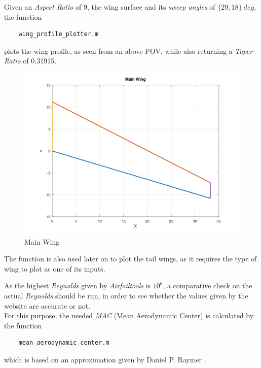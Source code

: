 \documentclass{article}
\begin{document}
Given an \textit{Aspect Ratio} of 9, the wing surface and its \textit{sweep angles} of $ \{29, 18 \} \ deg$,
the function 
\begin{verbatim}
    wing_profile_plotter.m
\end{verbatim}
plots the wing profile, as seen from an above POV, while also returning a \textit{Taper Ratio} of 0.31915.\\ 

\begin{figure}[h!]
    \centering
    \includegraphics[width=\textwidth]{Sources/Plots_and_Pictures/Main_Wing.png}
    \caption{Main Wing}
    \label{Main_wing}
\end{figure}

The function is also used later on to plot the tail wings, as it requires the type of wing to plot as one of its inputs.\\
\clearpage

As the highest \textit{Reynolds} given by \textit{Airfoiltools} is $10^6$, a comparative check on the 
actual \textit{Reynolds} should be run, in order to see whether the values given by the website are 
accurate or not.\\ 
For this purpose, the needed \textit{MAC} (Mean Aerodynamic Center) is calculated by the 
function \autocite{Airbus_replacement_repo}
\begin{verbatim}
    mean_aerodynamic_center.m
\end{verbatim}
which is based on an approximation given by Daniel P. Raymer \autocite{Raymer_Daniel}. \\ 
\end{document}
